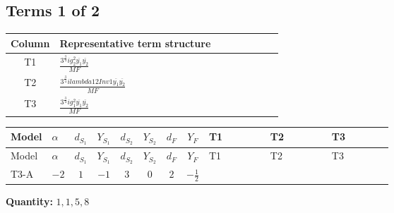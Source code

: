 \documentclass[8pt]{article}
\begin{document}
\begin{landscape}
\subsection*{Terms 1 of 2}
\begin{center}
\begin{tabular}{@{}c >{\raggedright\arraybackslash}p{0.82\linewidth}@{}}
\toprule
Column & Representative term structure \\
\midrule
T1 & \(\displaystyle \frac{3^{\frac{3}{4}} i g_{2}^{2} \overline{y_{1}} \overline{y_{2}}}{MF}\) \\
\midrule
T2 & \(\displaystyle \frac{3^{\frac{3}{4}} i lambda12Inv1 \overline{y_{1}} \overline{y_{2}}}{MF}\) \\
\midrule
T3 & \(\displaystyle \frac{3^{\frac{3}{4}} i g_{1}^{2} \overline{y_{1}} \overline{y_{2}}}{MF}\) \\
\midrule
\bottomrule
\end{tabular}
\end{center}
\smallskip
\tiny
\begin{longtable}{@{}llcccccc >{\raggedright\arraybackslash}p{0.21\linewidth} >{\raggedright\arraybackslash}p{0.21\linewidth} >{\raggedright\arraybackslash}p{0.21\linewidth}@{}}
\toprule
Model & $\alpha$ & $d_{S_1}$ & $Y_{S_1}$ & $d_{S_2}$ & $Y_{S_2}$ & $d_F$ & $Y_F$ & T1 & T2 & T3 \\
\midrule
\endfirsthead
\toprule
Model & $\alpha$ & $d_{S_1}$ & $Y_{S_1}$ & $d_{S_2}$ & $Y_{S_2}$ & $d_F$ & $Y_F$ & T1 & T2 & T3 \\
\midrule
\endhead
T3-A & $-2$ & $1$ & $-1$ & $3$ & $0$ & $2$ & $-\frac{1}{2}$ & \scriptsize\adjustbox{max width=\linewidth}{$\begin{gathered} - \frac{11 \cdot 3^{\frac{3}{4}} i g_{2}^{2} \overline{y_{1}} \overline{y_{2}}}{8 MF}\end{gathered}$} & \scriptsize\adjustbox{max width=\linewidth}{$\begin{gathered} - \frac{3^{\frac{3}{4}} i lambda12Inv1 \overline{y_{1}} \overline{y_{2}}}{6 MF}\end{gathered}$} & \scriptsize\adjustbox{max width=\linewidth}{$\begin{gathered} - \frac{3^{\frac{3}{4}} i g_{1}^{2} \overline{y_{1}} \overline{y_{2}}}{8 MF}\end{gathered}$} \\
\midrule
\bottomrule
\end{longtable}
\clearpage
\noindent\textbf{Quantity: }$\mathrm{1,1,5,8}$\par\smallskip

\end{landscape}
\end{document}
